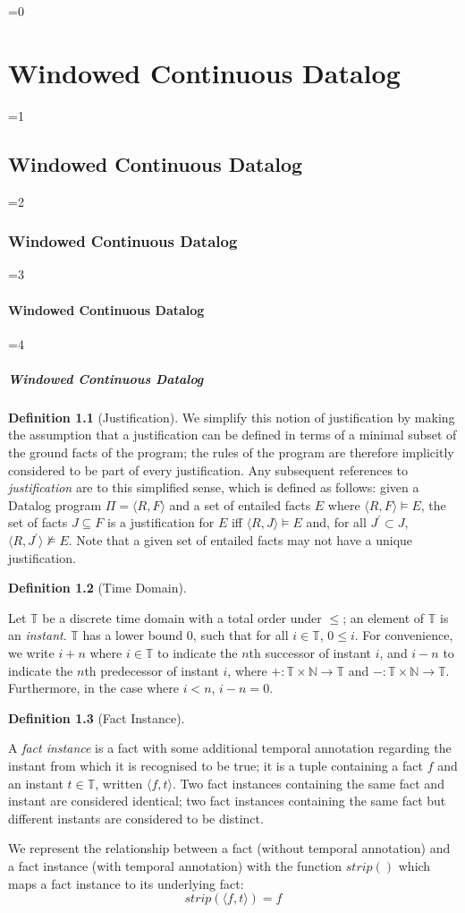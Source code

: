 \documentclass[twocolumn,preprint,3p,number]{elsarticle}
\theoremstyle{plain}
\theoremstyle{definition}
\newtheorem{definition}{Definition}
\newcounter{nestingdepth}
\newenvironment{nestedsection}[2]{
  \ifnum\value{nestingdepth}=0
    \chapter{#1}
  \else
    \ifnum\value{nestingdepth}=1
      \section{#1}
    \else
      \ifnum\value{nestingdepth}=2
        \subsection{#1}
      \else
        \ifnum\value{nestingdepth}=3
          \subsubsection{#1}
        \else
          \ifnum\value{nestingdepth}=4
            \paragraph{#1}
          \else
            \PackageError{nestedsections}{Maximum nesting level exceeded!}{uh oh!}
          \fi
        \fi
      \fi
    \fi
  \fi
  \addtocounter{nestingdepth}{1}
  \label{sec:#2}
}{\addtocounter{nestingdepth}{-1}}
\def\labeldef#1{\label{def:#1}}
\begin{document}
\begin{nestedsection}{Windowed Continuous Datalog}{semantics}
\begin{definition}[Justification]
We simplify this notion of justification by making the assumption that
a justification can be defined in terms of a minimal subset of the
ground facts of the program; the rules of the program are therefore
implicitly considered to be part of every justification. Any
subsequent references to {\em justification} are to this simplified
sense, which is defined as follows: given a Datalog program $\Pi =
\langle R, F \rangle$ and a set of entailed facts $E$ where $\langle
R, F \rangle \models E$, the set of facts $J \subseteq F$ is a
justification for $E$ iff $\langle R, J \rangle \models E$ and, for
all $J^\prime \subset J$, $\langle R, J^\prime \rangle \not\models E$. Note that a
given set of entailed facts may not have a unique justification.

\end{definition}

\begin{definition}[Time Domain]
\labeldef{continuous datalog: instant}

Let $\mathbb{T}$ be a discrete time domain with a total order under
$\leqslant$; an element of $\mathbb{T}$ is an {\em instant}.
$\mathbb{T}$ has a lower bound $0$, such that for all $i \in
\mathbb{T}$, $0 \leqslant i$. For convenience, we write $i+n$ where $i
\in \mathbb{T}$ to indicate the $n$th successor of instant $i$,
and $i-n$ to indicate the $n$th predecessor of instant $i$, where
${+ : \mathbb{T} \times \mathbb{N} \rightarrow \mathbb{T}}$ and
${- : \mathbb{T} \times \mathbb{N} \rightarrow \mathbb{T}}$.  Furthermore,
in the case where $i < n$, ${i - n = 0}$.

\end{definition}

\begin{definition}[Fact Instance]
 \labeldef{continuous datalog: fact instance}

A {\em fact instance} is a fact with some additional temporal
annotation regarding the instant from which it is recognised to be true;
it is a tuple containing a fact $f$ and an instant $t \in
\mathbb{T}$, written $\langle f, t \rangle$. Two fact instances
containing the same fact and instant are considered identical; two
fact instances containing the same fact but different instants are
considered to be distinct.

We represent the relationship between a fact (without temporal
annotation) and a fact instance (with temporal annotation) with the
function $strip()$ which maps a fact instance to its underlying fact:
\[ strip(\langle f, t\rangle) = f \]


\end{definition}
\end{nestedsection}
\end{document}
